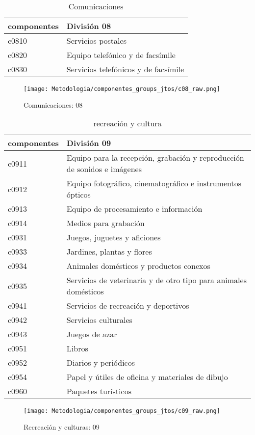 \documentclass[12pt]{article}
\begin{document}
\clearpage
\begin{table}[h!]
\caption{Comunicaciones}
\label{tab:compo_08}
\begin{tabular}{l m{10cm}}
\toprule
componentes & División 08 \\
\midrule
c0810 & Servicios postales \\
c0820 & Equipo telefónico y de facsímile \\
c0830 & Servicios telefónicos y de facsímile \\
\bottomrule
\end{tabular}
\end{table}
\begin{figure}[h!]
    \caption{Comunicaciones: 08}
    \label{fig:c08_raw}
    \centering
    \texttt{[image: Metodologia/componentes\_groups\_jtos/c08\_raw.png]}
\end{figure}

\clearpage
\begin{table}[h!]
\caption{recreación y cultura}
\label{tab:compo_09}
\begin{tabular}{l m{10cm}}
\toprule
componentes & División 09 \\
\midrule
c0911 & Equipo para la recepción, grabación y reproducción de sonidos e imágenes \\
c0912 & Equipo fotográfico, cinematográfico e instrumentos ópticos \\
c0913 & Equipo de procesamiento e información \\
c0914 & Medios para grabación \\
c0931 & Juegos, juguetes y aficiones \\
c0933 & Jardines, plantas y flores \\
c0934 & Animales domésticos y productos conexos \\
c0935 & Servicios de veterinaria y de otro tipo para animales domésticos \\
c0941 & Servicios de recreación y deportivos \\
c0942 & Servicios culturales \\
c0943 & Juegos de azar \\
c0951 & Libros \\
c0952 & Diarios y periódicos \\
c0954 & Papel y útiles de oficina y materiales de dibujo \\
c0960 & Paquetes turísticos \\
\bottomrule
\end{tabular}
\end{table}
\begin{figure}[h!]
    \caption{Recreación y culturas: 09}
    \label{fig:c09_raw}
    \centering
    \texttt{[image: Metodologia/componentes\_groups\_jtos/c09\_raw.png]}
\end{figure}
\end{document}
